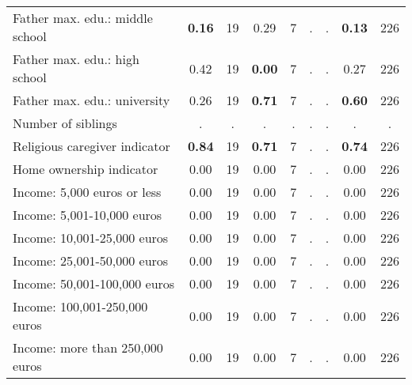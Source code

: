 \begin{tabular}{l c c c c c c c c}
Father max. edu.: middle school & \textbf{     0.16} &        19 &      0.29 &         7 &         . & . & \textbf{     0.13} &       226 \\
Father max. edu.: high school &      0.42 &        19 & \textbf{     0.00} &         7 &         . & . &      0.27 &       226 \\
Father max. edu.: university &      0.26 &        19 & \textbf{     0.71} &         7 &         . & . & \textbf{     0.60} &       226 \\
Number of siblings &         . & . &         . & . &         . & . &         . & . \\
Religious caregiver indicator & \textbf{     0.84} &        19 & \textbf{     0.71} &         7 &         . & . & \textbf{     0.74} &       226 \\
Home ownership indicator &      0.00 &        19 &      0.00 &         7 &         . & . &      0.00 &       226 \\
Income: 5,000 euros or less &      0.00 &        19 &      0.00 &         7 &         . & . &      0.00 &       226 \\
Income: 5,001-10,000 euros &      0.00 &        19 &      0.00 &         7 &         . & . &      0.00 &       226 \\
Income: 10,001-25,000 euros &      0.00 &        19 &      0.00 &         7 &         . & . &      0.00 &       226 \\
Income: 25,001-50,000 euros &      0.00 &        19 &      0.00 &         7 &         . & . &      0.00 &       226 \\
Income: 50,001-100,000 euros &      0.00 &        19 &      0.00 &         7 &         . & . &      0.00 &       226 \\
Income: 100,001-250,000 euros &      0.00 &        19 &      0.00 &         7 &         . & . &      0.00 &       226 \\
Income: more than 250,000 euros &      0.00 &        19 &      0.00 &         7 &         . & . &      0.00 &       226 \\
\bottomrule
\end{tabular}
